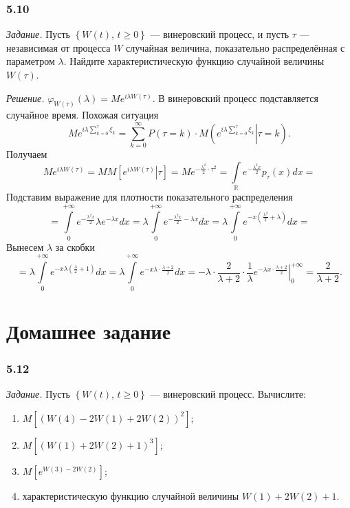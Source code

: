 \subsubsection*{5.10}

\textit{Задание.}
Пусть $ \left\{ W \left( t \right), \, t \geq 0 \right\} $ --- винеровский процесс,
и пусть $ \tau $ --- независимая от процесса $W$ случайная величина,
показательно распределённая с параметром $ \lambda $.
Найдите характеристическую функцию случайной величины $W \left( \tau \right) $.

\textit{Решение.}
$ \varphi_{W \left( \tau \right) } \left( \lambda \right) =
  Me^{i \lambda W \left( \tau \right) }$.
В винеровский процесс подставляется случайное время.
Похожая ситуация
$$Me^{i \lambda \sum \limits_{k = 0}^{ \tau } \xi_k} =
  \sum \limits_{k = 0}^{ \infty }
    P \left( \tau = k \right) \cdot
    M \left( \left. e^{i \lambda \sum \limits_{k = 0}^{ \tau } \xi_k} \right| \tau = k \right).$$
Получаем
$$Me^{i \lambda W \left( \tau \right) } =
  MM \left[ \left. e^{i \lambda W \left( \tau \right) } \right| \tau \right] =
  Me^{-\frac{ \lambda^2}{2} \cdot \tau^2 } =
  \int \limits_{ \mathbb{R}} e^{-\frac{ \lambda^2 x}{2}} p_{ \tau } \left( x \right) dx =$$
Подставим выражение для плотности показательного распределения
$$= \int \limits_0^{+\infty } e^{-\frac{ \lambda^2 x}{2}} \lambda e^{-\lambda x} dx =
  \lambda \int \limits_0^{+\infty } e^{-\frac{ \lambda^2 x}{2} - \lambda x} dx =
  \lambda \int \limits_0^{+ \infty } e^{-x \left( \frac{ \lambda^2}{2} + \lambda \right) } dx =$$
Вынесем $ \lambda $ за скобки
$$= \lambda \int \limits_0^{+ \infty } e^{-x \lambda \left( \frac{ \lambda }{2} + 1 \right) } dx =
  \lambda \int \limits_0^{+ \infty } e^{-x \lambda \cdot \frac{ \lambda + 2}{2}} dx =
  -\lambda \cdot \frac{2}{ \lambda + 2} \cdot \frac{1}{ \lambda }
  \left. e^{-\lambda x \cdot \frac{ \lambda + 2}{2}} \right|_0^{+ \infty } =
  \frac{2}{ \lambda + 2}.$$

\section*{Домашнее задание}

\subsubsection*{5.12}

\textit{Задание.}
Пусть $ \left\{ W \left( t \right), \, t \geq 0 \right\} $ --- винеровский процесс.
Вычислите:
\begin{enumerate}[label=\alph*)]
  \item $M \left[
      \left( W \left( 4 \right) - 2W \left( 1 \right) + 2W \left( 2 \right) \right)^2 \right] $;
  \item $M \left[ \left( W \left( 1 \right) + 2W \left( 2 \right) + 1 \right)^3 \right] $;
  \item $M \left[ e^{W \left( 3 \right) - 2W \left( 2 \right) } \right] $;
  \item характеристическую функцию случайной величины $W \left( 1 \right) + 2W \left( 2 \right) + 1$.
\end{enumerate}

